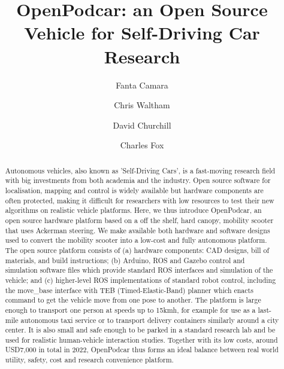 \documentclass[a4paper]{article}
\title{OpenPodcar: an Open Source Vehicle for Self-Driving Car Research}
\author[1,2]{Fanta Camara}
\author[2]{Chris Waltham}
\author[2]{David Churchill}
\author[1,2]{Charles Fox}
\affil[1]{Institute for Transport Studies, University of Leeds, UK}
\affil[2]{School of Computer Science, University of Lincoln, UK}
\begin{document}
\maketitle


\begin{abstract}
Autonomous vehicles, also known as 'Self-Driving Cars', is a fast-moving research field with big investments from both academia and the industry. Open source software for localisation, mapping and control is widely available but hardware components are often protected, making it difficult for researchers with low resources to test their new algorithms on realistic vehicle platforms. Here, we thus introduce OpenPodcar, an open source hardware platform based on a off the shelf, hard canopy, mobility scooter that uses Ackerman steering. We make available both hardware and software designs used to convert the mobility scooter into a low-cost and fully autonomous platform. The open source platform consists of (a) hardware components: CAD designs, bill of materials, and build instructions; (b) Arduino, ROS and Gazebo control and simulation software files which provide standard ROS interfaces and simulation of the vehicle; and (c) higher-level ROS implementations of standard robot control, including the move\_base interface with TEB (Timed-Elastic-Band) planner which enacts command to get the vehicle move from one pose to another. The platform is large enough to transport one person at speeds up to 15kmh, for example for use as a last-mile autonomous taxi service or to transport delivery containers similarly around a city center. It is also small and safe enough to be parked in a standard research lab and be used for realistic human-vehicle interaction studies. Together with its low costs, around USD7,000 in total in 2022, OpenPodcar thus forms an ideal balance between real world utility, safety, cost and research convenience platform.
\end{abstract}
\end{document}
